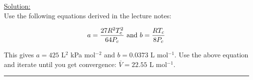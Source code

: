 \noindent
\underline{Solution:}\\

Use the following equations derived in the lecture notes:

$$a = \frac{27R^2T_c^2}{64P_c}\textnormal{ and }b = \frac{RT_c}{8P_c}$$

This gives $a = 425$ L$^2$ kPa mol$^{-2}$ and $b = 0.0373$ L mol$^{-1}$. Use the above equation and iterate until you get convergence: $\bar{V} = 22.55$ L mol$^{-1}$.

\hrule\vspace{0.5cm}
